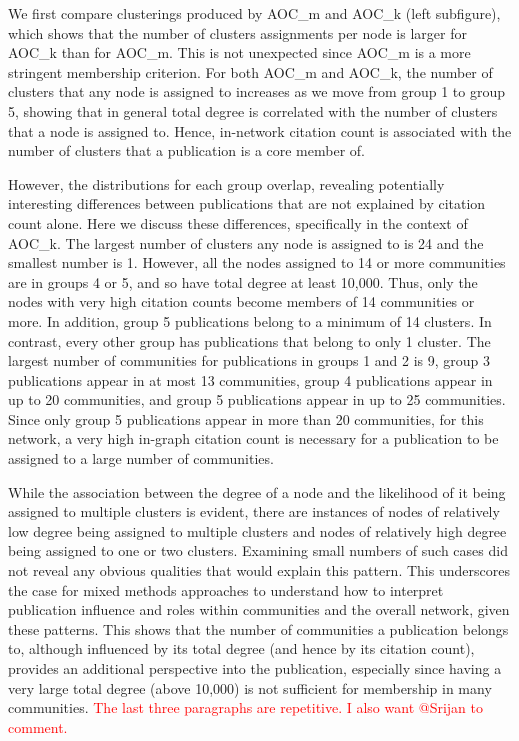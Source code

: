 \documentclass[12pt, oneside]{article}   	%
\begin{document}
We first compare clusterings produced by AOC\_m and AOC\_k (left subfigure), which shows that the number of clusters assignments per node is larger for AOC\_k than for AOC\_m. This is not unexpected since AOC\_m is a more stringent membership criterion. 
For both AOC\_m and AOC\_k, the number of clusters that any node is assigned to increases as we move from group 1 to group 5, showing
that in general total degree is correlated with the number of clusters that a node is assigned to.
Hence, in-network citation count is associated with the number of clusters that a publication is a core member of.

However, the distributions for each group overlap, revealing potentially interesting differences between publications that are not
explained by citation count alone. Here we discuss these differences, specifically in the context of AOC\_k. 
The largest number of clusters any node is assigned to is 24 and the smallest number is 1. However, all the nodes assigned to 14 or more communities are in groups 4 or 5, 
and so have total degree at least 10,000. Thus,  only the nodes with very high citation counts become members of 14 communities or more. In addition, group 5 publications belong to a minimum of 14 clusters.  
In contrast, every other group has publications that belong to only 1 cluster.  The largest number of communities for publications in groups 1 and 2 is  9, group 3 publications appear in at most 13 communities, 
group 4 publications appear in up to 20 communities, and group 5 publications appear in up to 25 communities.  Since only group 5 publications appear in more than 20 communities, for this network, a very high in-graph citation count is  necessary  for a publication to be assigned to a large number of communities.

While the association between the degree of a node and the likelihood of it being assigned to multiple clusters is evident, there are instances of nodes of relatively low degree being assigned to multiple clusters and nodes of relatively high degree being assigned to one or two clusters. Examining small numbers of such cases did not reveal any obvious qualities that would explain this pattern. This underscores the case for mixed methods approaches to understand how to interpret publication influence and roles within communities and the overall network, given these patterns. This shows that  the number of communities a publication belongs to, although influenced by its total degree (and hence by its citation count), provides an additional perspective into the publication, especially since having a very large total degree (above 10,000) is not sufficient  for membership in many communities. \textcolor{red}{The last three paragraphs are repetitive. I also want @Srijan to comment.}
\end{document}
